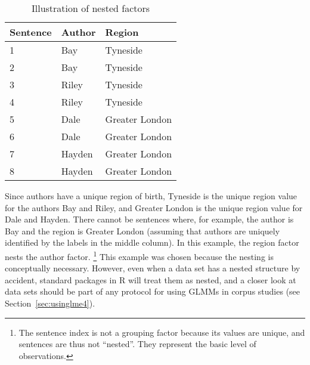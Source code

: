 \documentclass[a4paper,12pt]{article}
\begin{document}
\begin{table}
  \centering
  \begin{tabular}{lll}
    \toprule
    \textbf{Sentence} & \textbf{Author}  & \textbf{Region}        \\
    \midrule
                    1 &           Bay    &         Tyneside       \\
                    2 &           Bay    &         Tyneside       \\
                    3 &           Riley  &         Tyneside       \\
                    4 &           Riley  &         Tyneside       \\
                    5 &           Dale   &         Greater London \\
                    6 &           Dale   &         Greater London \\
                    7 &           Hayden &         Greater London \\
                    8 &           Hayden &         Greater London \\
    \bottomrule
  \end{tabular}
  \caption{Illustration of nested factors}
  \label{tab:nested}
\end{table}

Since authors have a unique region of birth, Tyneside is the unique region value for the authors Bay and Riley, and Greater London is the unique region value for Dale and Hayden.
There cannot be sentences where, for example, the author is Bay and the region is Greater London (assuming that authors are uniquely identified by the labels in the middle column).
In this example, the region factor nests the author factor.%
\footnote{The sentence index is not a grouping factor because its values are unique, and sentences are thus not ``nested''.
They represent the basic level of observations.}
This example was chosen because the nesting is conceptually necessary.
However, even when a data set has a nested structure by accident, standard packages in R will treat them as nested, and a closer look at data sets should be part of any protocol for using GLMMs in corpus studies (see Section~\ref{sec:usinglme4}).
\end{document}

